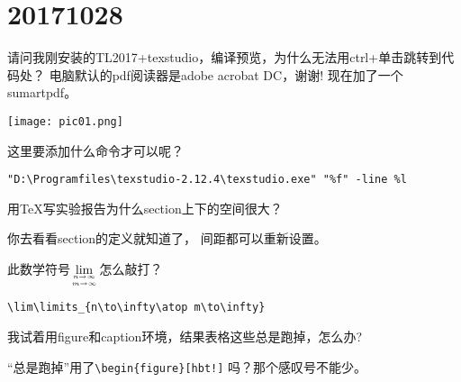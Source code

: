 \documentclass[QA.tex]{subfiles}
\begin{document}
%
%

\chapter{20171028}\label{ch1028}

\begin{qst}\label{Q2017102801}
请问我刚安装的TL2017+texstudio，编译预览，为什么无法用ctrl+单击跳转到代码处？
电脑默认的pdf阅读器是adobe acrobat DC，谢谢!
现在加了一个sumartpdf。

\texttt{[image: pic01.png]}

这里要添加什么命令才可以呢？
\end{qst}
\ans \verb|"D:\Programfiles\texstudio-2.12.4\texstudio.exe" "%f" -line %l|

\begin{qst}\label{Q2017102802}
用TeX写实验报告为什么section上下的空间很大？
\end{qst}
\ans 你去看看section的定义就知道了， 间距都可以重新设置。

\begin{qst}\label{Q2017102803}
此数学符号$\displaystyle\lim\limits_{n\to\infty\atop m\to\infty}$怎么敲打？
\end{qst}
\ans \verb|\lim\limits_{n\to\infty\atop m\to\infty}|

\begin{qst}\label{Q2017102804}
我试着用figure和caption环境，结果表格这些总是跑掉，怎么办?
\end{qst}
\ans “总是跑掉”用了\verb|\begin{figure}[hbt!]| 吗？那个感叹号不能少。
\end{document}
